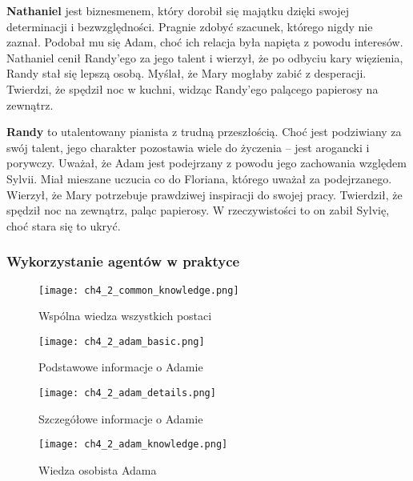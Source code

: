 \textbf{Nathaniel} jest biznesmenem, który dorobił się majątku dzięki swojej determinacji i bezwzględności.
Pragnie zdobyć szacunek, którego nigdy nie zaznał. Podobał mu się Adam, choć ich relacja była
napięta z powodu interesów. Nathaniel cenił Randy'ego za jego talent i wierzył, że po odbyciu kary
więzienia, Randy stał się lepszą osobą. Myślał, że Mary mogłaby zabić z desperacji. Twierdzi, że
spędził noc w kuchni, widząc Randy'ego palącego papierosy na zewnątrz.

\textbf{Randy} to utalentowany pianista z trudną przeszłością. Choć jest podziwiany za swój talent, jego
charakter pozostawia wiele do życzenia – jest arogancki i porywczy. Uważał, że Adam jest podejrzany
z powodu jego zachowania względem Sylvii. Miał mieszane uczucia co do Floriana, którego uważał za
podejrzanego. Wierzył, że Mary potrzebuje prawdziwej inspiracji do swojej pracy. Twierdził, że
spędził noc na zewnątrz, paląc papierosy. W rzeczywistości to on zabił Sylvię, choć stara się to
ukryć.

\subsubsection*{Wykorzystanie agentów w praktyce}

\lipsum[1]

\begin{figure}[h!]
    \centering
    \texttt{[image: ch4\_2\_common\_knowledge.png]}
    \caption{Wspólna wiedza wszystkich postaci}
    \label{fig:ch4_2_common_knowledge}
\end{figure}

\lipsum[1]

\begin{figure}[h!]
    \centering
    \texttt{[image: ch4\_2\_adam\_basic.png]}
    \caption{Podstawowe informacje o Adamie}
    \label{fig:ch4_2_adam_basic}
\end{figure}

\lipsum[1]

\begin{figure}[h!]
    \centering
    \texttt{[image: ch4\_2\_adam\_details.png]}
    \caption{Szczegółowe informacje o Adamie}
    \label{fig:ch4_2_adam_details}
\end{figure}

\lipsum[1]

\begin{figure}[h!]
    \centering
    \texttt{[image: ch4\_2\_adam\_knowledge.png]}
    \caption{Wiedza osobista Adama}
    \label{fig:ch4_2_adam_knowledge}
\end{figure}

